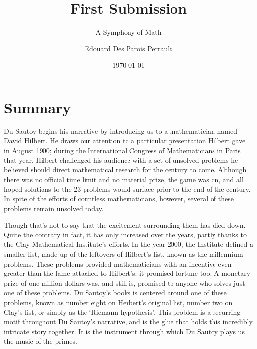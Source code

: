 \documentclass{mathbook}
\title{First Submission}
\author{Edouard Des Parois Perrault}
\date{\today}
\subtitle{A Symphony of Math}
\begin{document}
    \maketitle
    \onehalfspacing
    \section{Summary}
    Du Sautoy begins his narrative by introducing us to a mathematician named David Hilbert. He draws our attention to a particular presentation Hilbert gave in August 1900; during the International Congress of Mathematicians in Paris that year, Hilbert challenged his audience with a set of unsolved problems he believed should direct mathematical research for the century to come. Although there was no official time limit and no material prize, the game was on, and all hoped solutions to the 23 problems would surface prior to the end of the century. \cite{2011} In spite of the efforts of countless mathematicians, however, several of these problems remain unsolved today. \par
    
    Though that's not to say that the excitement surrounding them has died down. Quite the contrary in fact, it has only increased over the years, partly thanks to the Clay Mathematical Institute's efforts. In the year 2000, the Institute defined a smaller list, made up of the leftovers of Hilbert's list, known as the millennium problems. These problems provided mathematicians with an incentive even greater than the fame attached to Hilbert's: it promised fortune too. A monetary prize of one million dollars was, and still is, promised to anyone who solves just one of these problems. \cite[p.~15]{Sautoy2003} Du Sautoy's books is centered around one of these problems, known as number eight on Herbert's original list, number two on Clay's list, or simply as the `Riemann hypothesis'. \cite[p.~1]{Sautoy2003} This problem is a recurring motif throughout Du Sautoy's narrative, and is the glue that holds this incredibly intricate story together. It is the instrument through which Du Sautoy plays us the music of the primes.\par 
\end{document}
